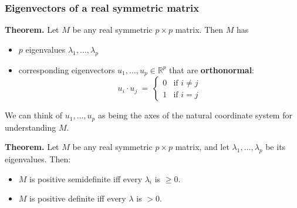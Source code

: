 \documentclass[smaller]{beamer}
\def\R{{\mathbb R}}
\def\darkgreen{\color{green!60!black}}
\def\v2{{\vskip.2in}}
\def\R{{\mathbb R}}
\begin{document}
\begin{frame}
\frametitle{Eigenvectors of a real symmetric matrix}

{\bf Theorem.} Let $M$ be any real symmetric $p \times p$ matrix. Then $M$ has
\begin{itemize}
\item $p$ eigenvalues $\lambda_1, \ldots, \lambda_p$
\item corresponding eigenvectors $u_1, \ldots, u_p \in \R^p$ that are {\bf orthonormal}:
$$ u_i \cdot u_j \ = \ 
\left\{
\begin{array}{ll}
0 & \mbox{if $i \neq j$} \\
1 & \mbox{if $i = j$}
\end{array}
\right.
$$

\end{itemize}

\pause\v2
\alert{We can think of $u_1, \ldots, u_p$ as being the axes of the natural coordinate 
system for understanding $M$.}

\pause\v2
{\darkgreen
{\bf Theorem.} Let $M$ be any real symmetric $p \times p$ matrix, and let $\lambda_1, \ldots, \lambda_p$ be its eigenvalues. Then:}
\begin{itemize}
\item {\darkgreen $M$ is positive semidefinite iff every $\lambda_i$ is $\geq 0$.}
\item {\darkgreen $M$ is positive definite iff every $\lambda$ is $> 0$.}
\end{itemize}


\end{frame}
\end{document}
